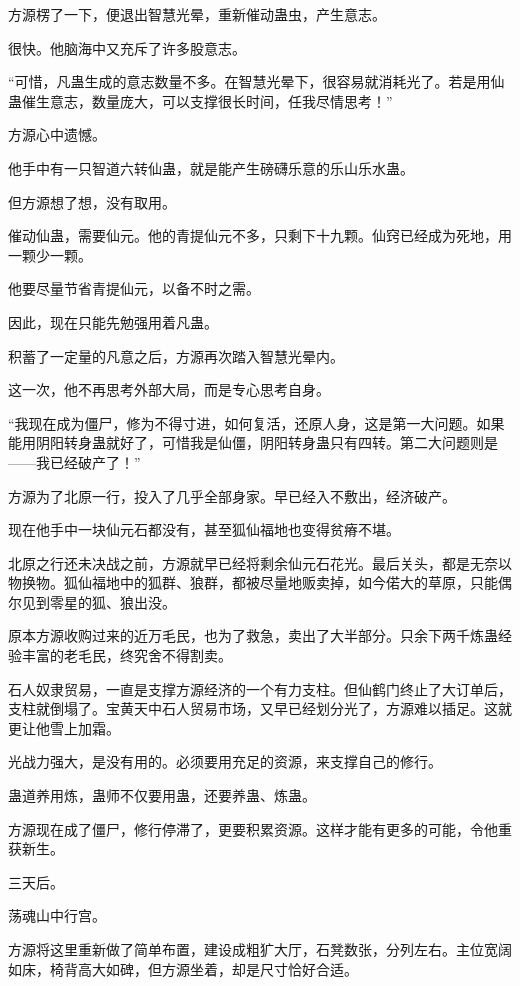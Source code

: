 \begin{this_body}
方源楞了一下，便退出智慧光晕，重新催动蛊虫，产生意志。

很快。他脑海中又充斥了许多股意志。

“可惜，凡蛊生成的意志数量不多。在智慧光晕下，很容易就消耗光了。若是用仙蛊催生意志，数量庞大，可以支撑很长时间，任我尽情思考！”

方源心中遗憾。

他手中有一只智道六转仙蛊，就是能产生磅礴乐意的乐山乐水蛊。

但方源想了想，没有取用。

催动仙蛊，需要仙元。他的青提仙元不多，只剩下十九颗。仙窍已经成为死地，用一颗少一颗。

他要尽量节省青提仙元，以备不时之需。

因此，现在只能先勉强用着凡蛊。

积蓄了一定量的凡意之后，方源再次踏入智慧光晕内。

这一次，他不再思考外部大局，而是专心思考自身。

“我现在成为僵尸，修为不得寸进，如何复活，还原人身，这是第一大问题。如果能用阴阳转身蛊就好了，可惜我是仙僵，阴阳转身蛊只有四转。第二大问题则是——我已经破产了！”

方源为了北原一行，投入了几乎全部身家。早已经入不敷出，经济破产。

现在他手中一块仙元石都没有，甚至狐仙福地也变得贫瘠不堪。

北原之行还未决战之前，方源就早已经将剩余仙元石花光。最后关头，都是无奈以物换物。狐仙福地中的狐群、狼群，都被尽量地贩卖掉，如今偌大的草原，只能偶尔见到零星的狐、狼出没。

原本方源收购过来的近万毛民，也为了救急，卖出了大半部分。只余下两千炼蛊经验丰富的老毛民，终究舍不得割卖。

石人奴隶贸易，一直是支撑方源经济的一个有力支柱。但仙鹤门终止了大订单后，支柱就倒塌了。宝黄天中石人贸易市场，又早已经划分光了，方源难以插足。这就更让他雪上加霜。

光战力强大，是没有用的。必须要用充足的资源，来支撑自己的修行。

蛊道养用炼，蛊师不仅要用蛊，还要养蛊、炼蛊。

方源现在成了僵尸，修行停滞了，更要积累资源。这样才能有更多的可能，令他重获新生。

三天后。

荡魂山中行宫。

方源将这里重新做了简单布置，建设成粗犷大厅，石凳数张，分列左右。主位宽阔如床，椅背高大如碑，但方源坐着，却是尺寸恰好合适。


\end{this_body}
